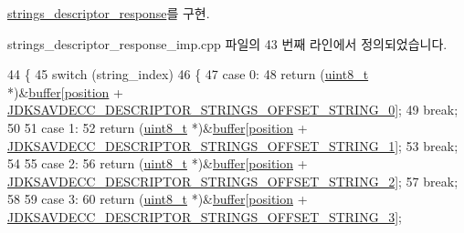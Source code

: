 \hyperlink{classavdecc__lib_1_1strings__descriptor__response_ae8f3e50f4e5051488a864fd8acc6da31}{strings\+\_\+descriptor\+\_\+response}를 구현.



strings\+\_\+descriptor\+\_\+response\+\_\+imp.\+cpp 파일의 43 번째 라인에서 정의되었습니다.


\begin{DoxyCode}
44 \{
45     \textcolor{keywordflow}{switch} (string\_index)
46     \{
47     \textcolor{keywordflow}{case} 0:
48         \textcolor{keywordflow}{return} (\hyperlink{stdint_8h_aba7bc1797add20fe3efdf37ced1182c5}{uint8\_t} *)&\hyperlink{classavdecc__lib_1_1descriptor__response__base__imp_a56ed84df35de10bdb65e72b184309497}{buffer}[\hyperlink{classavdecc__lib_1_1descriptor__response__base__imp_a7a04afe5347934be732ec70a70bd0a28}{position} + 
      \hyperlink{group__descriptor__strings_gab9913a38c283200ad176d5101dfa248f}{JDKSAVDECC\_DESCRIPTOR\_STRINGS\_OFFSET\_STRING\_0}];
49         \textcolor{keywordflow}{break};
50 
51     \textcolor{keywordflow}{case} 1:
52         \textcolor{keywordflow}{return} (\hyperlink{stdint_8h_aba7bc1797add20fe3efdf37ced1182c5}{uint8\_t} *)&\hyperlink{classavdecc__lib_1_1descriptor__response__base__imp_a56ed84df35de10bdb65e72b184309497}{buffer}[\hyperlink{classavdecc__lib_1_1descriptor__response__base__imp_a7a04afe5347934be732ec70a70bd0a28}{position} + 
      \hyperlink{group__descriptor__strings_ga21ae751b7b93d84d434ea47ef184fba2}{JDKSAVDECC\_DESCRIPTOR\_STRINGS\_OFFSET\_STRING\_1}];
53         \textcolor{keywordflow}{break};
54 
55     \textcolor{keywordflow}{case} 2:
56         \textcolor{keywordflow}{return} (\hyperlink{stdint_8h_aba7bc1797add20fe3efdf37ced1182c5}{uint8\_t} *)&\hyperlink{classavdecc__lib_1_1descriptor__response__base__imp_a56ed84df35de10bdb65e72b184309497}{buffer}[\hyperlink{classavdecc__lib_1_1descriptor__response__base__imp_a7a04afe5347934be732ec70a70bd0a28}{position} + 
      \hyperlink{group__descriptor__strings_ga8966d8df8fc961cf0b4f4c04fe0c4474}{JDKSAVDECC\_DESCRIPTOR\_STRINGS\_OFFSET\_STRING\_2}];
57         \textcolor{keywordflow}{break};
58 
59     \textcolor{keywordflow}{case} 3:
60         \textcolor{keywordflow}{return} (\hyperlink{stdint_8h_aba7bc1797add20fe3efdf37ced1182c5}{uint8\_t} *)&\hyperlink{classavdecc__lib_1_1descriptor__response__base__imp_a56ed84df35de10bdb65e72b184309497}{buffer}[\hyperlink{classavdecc__lib_1_1descriptor__response__base__imp_a7a04afe5347934be732ec70a70bd0a28}{position} + 
      \hyperlink{group__descriptor__strings_ga7c7468f55f4795e19fc7371cc2799d12}{JDKSAVDECC\_DESCRIPTOR\_STRINGS\_OFFSET\_STRING\_3}];

\end{DoxyCode}
